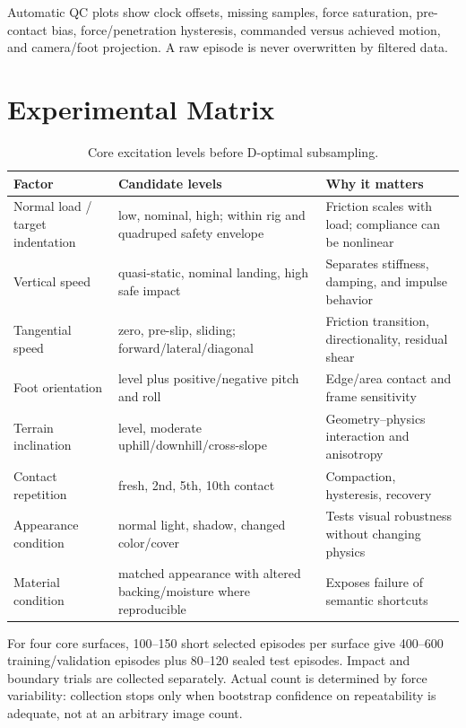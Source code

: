 Automatic QC plots show clock offsets, missing samples, force saturation, pre-contact bias, force/penetration hysteresis, commanded versus achieved motion, and camera/foot projection. A raw episode is never overwritten by filtered data.

\section{Experimental Matrix}
\label{app:matrix}

\begin{table}[ht]
\centering
\caption{Core excitation levels before D-optimal subsampling.}
\label{tab:matrix}
\small
\begin{tabularx}{\textwidth}{@{}L{34mm}Y Y@{}}
\toprule
\textbf{Factor} & \textbf{Candidate levels} & \textbf{Why it matters}\\
\midrule
Normal load / target indentation & low, nominal, high; within rig and quadruped safety envelope & Friction scales with load; compliance can be nonlinear\\
Vertical speed & quasi-static, nominal landing, high safe impact & Separates stiffness, damping, and impulse behavior\\
Tangential speed & zero, pre-slip, sliding; forward/lateral/diagonal & Friction transition, directionality, residual shear\\
Foot orientation & level plus positive/negative pitch and roll & Edge/area contact and frame sensitivity\\
Terrain inclination & level, moderate uphill/downhill/cross-slope & Geometry--physics interaction and anisotropy\\
Contact repetition & fresh, 2nd, 5th, 10th contact & Compaction, hysteresis, recovery\\
Appearance condition & normal light, shadow, changed color/cover & Tests visual robustness without changing physics\\
Material condition & matched appearance with altered backing/moisture where reproducible & Exposes failure of semantic shortcuts\\
\bottomrule
\end{tabularx}
\end{table}

For four core surfaces, 100--150 short selected episodes per surface give 400--600 training/validation episodes plus 80--120 sealed test episodes. Impact and boundary trials are collected separately. Actual count is determined by force variability: collection stops only when bootstrap confidence on repeatability is adequate, not at an arbitrary image count.

